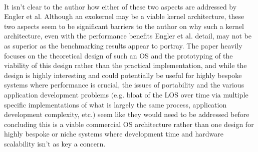\documentclass[11pt]{article}
\theoremstyle{plain}
\theoremstyle{definition}
\begin{document}
\\
It isn't clear to the author how either of these two aspects are addressed by Engler et al. Although an exokernel may be a viable kernel architecture, these two aspects seem to be significant barriers to the author on why such a kernel architecture, even with the performance benefits Engler et al. detail, may not be as superior as the benchmarking results appear to portray. The paper heavily focuses on the theoretical design of such an OS and the prototyping of the viability of this design rather than the practical implementation,  and while the design is highly interesting and could potentially be useful for highly bespoke systems where performance is crucial, the issues of portability and the various application development problems $($e.g. bloat of the LOS over time via multiple specific implementations of what is largely the same process, application development complexity, etc.$)$ seem like they would need to be addressed before concluding this is a viable commercial OS architecture rather than one design for highly bespoke or niche systems where development time and hardware scalability isn't as key a concern.
\pagebreak



\end{document}
